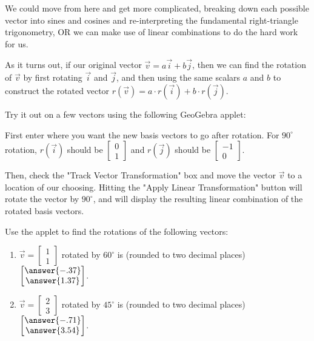 \documentclass{ximera}
\begin{document}
\begin{exploration}
\begin{example}
        We could move from here and get more complicated, breaking down each possible vector into sines and cosines and re-interpreting the fundamental right-triangle trigonometry, OR we can make use of linear combinations to do the hard work for us.

        As it turns out, if our original vector $\vec{v}=a\vec{i}+b\vec{j}$, then we can find the rotation of $\vec{v}$ by first rotating $\vec{i}$ and $\vec{j}$, and then using the same scalars $a$ and $b$ to construct the rotated vector $r(\vec{v}) = a \cdot r(\vec{i}) + b \cdot r(\vec{j})$.

        Try it out on a few vectors using the following GeoGebra applet:

        First enter where you want the new basis vectors to go after rotation. For $90^\circ$ rotation, $r(\vec{i})$ should be $\begin{bmatrix} 0 \\ 1 \end{bmatrix}$ and $r(\vec{j})$ should be $\begin{bmatrix} -1 \\ 0 \end{bmatrix}$.

        Then, check the "Track Vector Transformation" box and move the vector $\vec{v}$ to a location of our choosing. Hitting the "Apply Linear Transformation" button will rotate the vector by $90^\circ$, and will display the resulting linear combination of the rotated basis vectors.

        \begin{center}
        \end{center}

        Use the applet to find the rotations of the following vectors:

        \begin{enumerate}

            \item $\vec{v}=\begin{bmatrix} 1 \\ 1 \end{bmatrix}$ rotated by $60^\circ$ is (rounded to two decimal places) $\begin{bmatrix} \answer{-.37} \\ \answer{1.37} \end{bmatrix}$.
            
            \item $\vec{v}=\begin{bmatrix} 2 \\ 3 \end{bmatrix}$ rotated by $45^\circ$ is (rounded to two decimal places) $\begin{bmatrix} \answer{-.71} \\ \answer{3.54} \end{bmatrix}$.
            

\end{enumerate}
\end{example}
\end{exploration}
\end{document}
